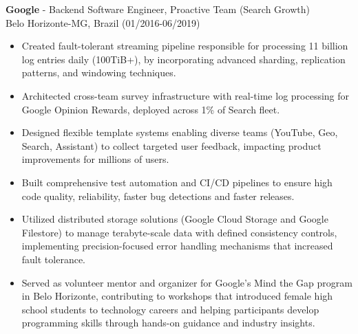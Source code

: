 
\normalsize{\textbf{Google} - Backend Software Engineer, Proactive Team (Search Growth)}\\
    \footnotesize{Belo Horizonte-MG, Brazil (01/2016-06/2019)}
    
\begin{itemize}
    \item \small{Created fault-tolerant streaming pipeline responsible for processing 11 billion
        log entries daily (100TiB+), by incorporating advanced sharding, replication patterns, and
        windowing techniques.}

    \item \footnotesize{Architected cross-team survey infrastructure with real-time log processing 
        for Google Opinion Rewards, deployed across 1\% of Search fleet.}

    \item \footnotesize{Designed flexible template systems enabling diverse teams (YouTube, Geo, 
        Search, Assistant) to collect targeted user feedback, impacting product improvements 
        for millions of users.}

    \clearpage

    \item \small{Built comprehensive test automation and CI/CD pipelines to ensure high code 
        quality, reliability, faster bug detections and faster releases.}

    \item \small{Utilized distributed storage solutions (Google Cloud Storage and Google
        Filestore) to manage terabyte-scale data with defined consistency controls, implementing
        precision-focused error handling mechanisms that increased fault tolerance.}

    \item \footnotesize{Served as volunteer mentor and organizer for Google's Mind the Gap program 
        in Belo Horizonte, contributing to workshops that introduced female high school students to 
        technology careers and helping participants develop programming skills through hands-on 
        guidance and industry insights.}
\end{itemize}